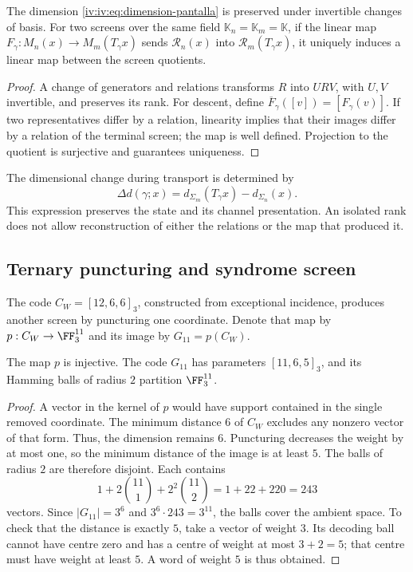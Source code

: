 \begin{proposition}
\label{iv:iv:prop:pantalla-transporte}
The dimension \eqref{iv:iv:eq:dimension-pantalla} is preserved
under invertible changes of basis. For two screens over the same field
\(\mathbb K_n=\mathbb K_m=\mathbb K\), if the linear map
\(F_\gamma:M_n(x)\to M_m(T_\gamma x)\) sends
\(\mathcal R_n(x)\) into \(\mathcal R_m(T_\gamma x)\), it uniquely
induces a linear map between the screen quotients.
\end{proposition}
\begin{proof}
A change of generators and relations transforms \(R\) into
\(URV\), with \(U,V\) invertible, and preserves its rank. For
descent, define
\(\overline F_\gamma([v])=[F_\gamma(v)]\). If two
representatives differ by a relation, linearity implies that their images differ
by a relation of the terminal screen; the map is
well defined. Projection to the quotient is surjective and
guarantees uniqueness.
\end{proof}

The dimensional change during transport is determined
by
\[
 \Delta d(\gamma;x)=d_{\Sigma_m}(T_\gamma x)
                         -d_{\Sigma_n}(x).
\]
This expression preserves the state and its channel presentation.
An isolated rank does not allow reconstruction of either the relations or
the map that produced it.

\subsection{Ternary puncturing and syndrome screen}

The code \(C_W=[12,6,6]_3\), constructed from
exceptional incidence, produces another screen by
puncturing one coordinate. Denote
that map by \(p:C_W\to\FF_3^{11}\) and
its image by \(G_{11}=p(C_W)\).

\begin{proposition}
\label{iv:iv:prop:codigo-once}
The map \(p\) is injective. The code \(G_{11}\) has
parameters \([11,6,5]_3\), and its Hamming balls of radius
\(2\) partition \(\FF_3^{11}\).
\end{proposition}
\begin{proof}
A vector in the kernel of \(p\) would have support contained in
the single removed coordinate. The minimum distance \(6\)
of \(C_W\) excludes any nonzero vector of that form.
Thus, the dimension remains \(6\). Puncturing decreases
the weight by at most one, so the minimum distance
of the image is at least \(5\). The balls of radius \(2\)
are therefore disjoint. Each contains
\[
 1+2\binom{11}{1}+2^2\binom{11}{2}
 =1+22+220=243
\]
vectors. Since \(|G_{11}|=3^6\) and
\(3^6\cdot243=3^{11}\), the balls cover the ambient space.
To check that the distance is exactly \(5\),
take a vector of weight \(3\). Its decoding ball
cannot have centre zero and has a centre of weight at
most \(3+2=5\); that centre must have weight at least
\(5\). A word of weight \(5\) is thus obtained.
\end{proof}

